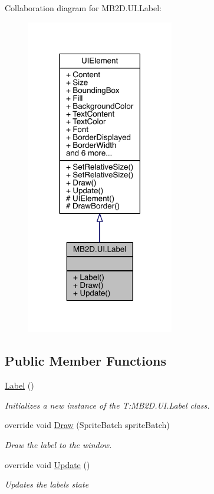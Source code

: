 Collaboration diagram for M\+B2\+D.\+U\+I.\+Label\+:
\nopagebreak
\begin{figure}[H]
\begin{center}
\leavevmode
\includegraphics[width=182pt]{class_m_b2_d_1_1_u_i_1_1_label__coll__graph}
\end{center}
\end{figure}
\subsection*{Public Member Functions}
\begin{DoxyCompactItemize}
\item 
\hyperlink{class_m_b2_d_1_1_u_i_1_1_label_af2e14465a2e06ca65487481d543de78c}{Label} ()
\begin{DoxyCompactList}\small\item\em Initializes a new instance of the T\+:\+M\+B2\+D.\+U\+I.\+Label class. \end{DoxyCompactList}\item 
override void \hyperlink{class_m_b2_d_1_1_u_i_1_1_label_a976ec212cedf0710fb35cd578e1e51b1}{Draw} (Sprite\+Batch sprite\+Batch)
\begin{DoxyCompactList}\small\item\em Draw the label to the window. \end{DoxyCompactList}\item 
override void \hyperlink{class_m_b2_d_1_1_u_i_1_1_label_ae4cc8f88f75b0d16d983bb754d214ef4}{Update} ()
\begin{DoxyCompactList}\small\item\em Updates the labels state \end{DoxyCompactList}\end{DoxyCompactItemize}

